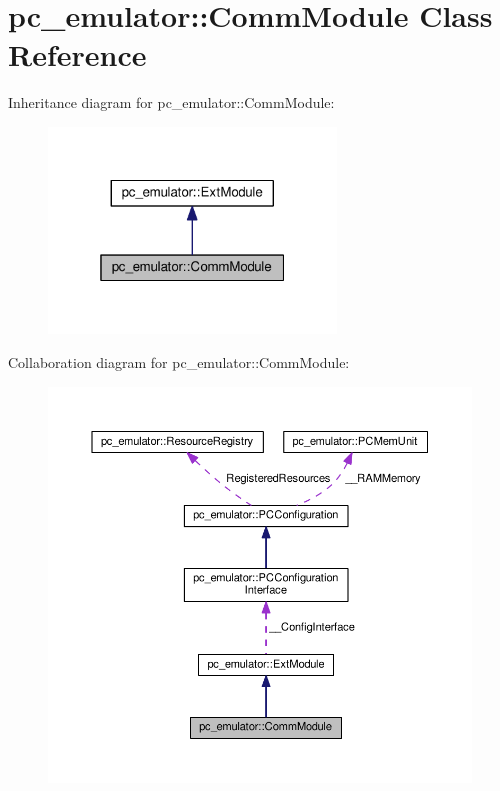 \hypertarget{classpc__emulator_1_1CommModule}{}\section{pc\+\_\+emulator\+:\+:Comm\+Module Class Reference}
\label{classpc__emulator_1_1CommModule}


Inheritance diagram for pc\+\_\+emulator\+:\+:Comm\+Module\+:
\nopagebreak
\begin{figure}[H]
\begin{center}
\leavevmode
\includegraphics[width=217pt]{classpc__emulator_1_1CommModule__inherit__graph}
\end{center}
\end{figure}


Collaboration diagram for pc\+\_\+emulator\+:\+:Comm\+Module\+:
\nopagebreak
\begin{figure}[H]
\begin{center}
\leavevmode
\includegraphics[width=350pt]{classpc__emulator_1_1CommModule__coll__graph}
\end{center}
\end{figure}
